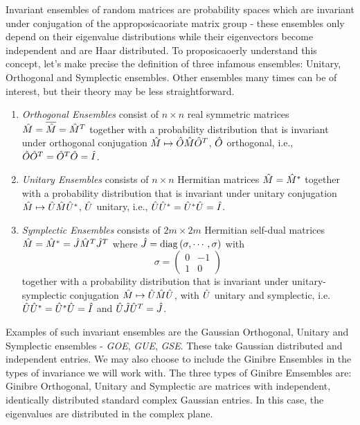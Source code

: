 Invariant ensembles of random matrices are probability spaces which are invariant under conjugation of the approposicaoriate matrix group - these ensembles only depend on their eigenvalue distributions while their eigenvectors become independent and are Haar distributed. To proposicaoerly understand this concept, let's make precise the definition of three infamous ensembles: Unitary, Orthogonal and Symplectic ensembles. Other ensembles many times can be of interest, but their theory may be less straightforward.

\begin{enumerate}
	\item \textit{Orthogonal Ensembles} consist of $n \times n$ real symmetric matrices $\hat M = \overline{\hat M} = \hat M^T$ together with a probability distribution that is invariant under orthogonal conjugation $\hat M \mapsto \hat O \hat M \hat O^T$, $\hat O$ orthogonal, i.e., $\hat O \hat O^T = \hat O^T \hat O = \hat I$.  
	\item \textit{Unitary Ensembles} consists of $n \times n$ Hermitian matrices $\hat M = \hat M^*$ together with a probability distribution that is invariant under unitary conjugation $\hat M \mapsto \hat U \hat M \hat U^*$, $\hat U$ unitary, i.e., $\hat U \hat U^* = \hat U^* \hat U = \hat I$.  
	\item \textit{Symplectic Ensembles} consists of $2m \times 2m$ Hermitian self-dual matrices $\hat M = \hat M^* = \hat J \hat M^T \hat J^T$ where $\hat J = \operatorname{diag}{(\sigma, \cdots, \sigma)}$ with $$\sigma = \begin{pmatrix} 0 & -1\\	1 & 0 \end{pmatrix}$$  together with a probability distribution that is invariant under unitary-symplectic conjugation $\hat M \mapsto \hat U \hat M \hat U$, with $\hat U$ unitary and symplectic, i.e. $\hat U \hat U^* = \hat U^* \hat U = \hat I$ and $\hat U \hat J \hat U^T = \hat J$.
\end{enumerate}

Examples of such invariant ensembles are the Gaussian Orthogonal, Unitary and Symplectic ensembles - \textit{GOE}, \textit{GUE}, \textit{GSE}. These take Gaussian distributed and independent entries. We may also choose to include the Ginibre Ensembles in the types of invariance we will work with. The three types of Ginibre Emsembles are: Ginibre Orthogonal, Unitary and Symplectic are matrices with independent, identically distributed standard complex Gaussian entries. In this case, the eigenvalues are distributed in the complex plane. 

